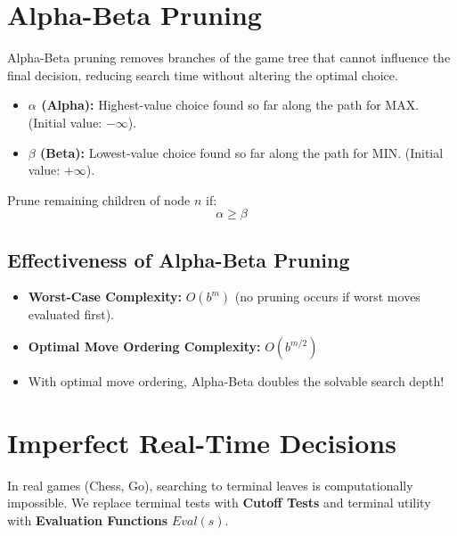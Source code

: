 \documentclass[12pt,a4paper]{article}
\begin{document}
\section{Alpha-Beta Pruning}

Alpha-Beta pruning removes branches of the game tree that cannot influence the final decision, reducing search time without altering the optimal choice.

\begin{tcolorbox}[defbox, title={Definition of Alpha ($\alpha$) and Beta ($\beta$)}]
  \begin{itemize}[leftmargin=*, noitemsep]
    \item \textbf{$\alpha$ (Alpha):} Highest-value choice found so far along the path for MAX. (Initial value: $-\infty$).
    \item \textbf{$\beta$ (Beta):} Lowest-value choice found so far along the path for MIN. (Initial value: $+\infty$).
  \end{itemize}
\end{tcolorbox}

\begin{tcolorbox}[formulabox, title={Alpha-Beta Pruning Condition}]
  Prune remaining children of node $n$ if:
  \begin{equation}
    \alpha \ge \beta
  \end{equation}
\end{tcolorbox}

\subsection{Effectiveness of Alpha-Beta Pruning}
\begin{itemize}[leftmargin=*, itemsep=3pt]
  \item \textbf{Worst-Case Complexity:} $O(b^m)$ (no pruning occurs if worst moves evaluated first).
  \item \textbf{Optimal Move Ordering Complexity:} $O(b^{m/2})$
  \item With optimal move ordering, Alpha-Beta doubles the solvable search depth!
\end{itemize}

\section{Imperfect Real-Time Decisions}
In real games (Chess, Go), searching to terminal leaves is computationally impossible. We replace terminal tests with \textbf{Cutoff Tests} and terminal utility with \textbf{Evaluation Functions} $Eval(s)$.
\end{document}

